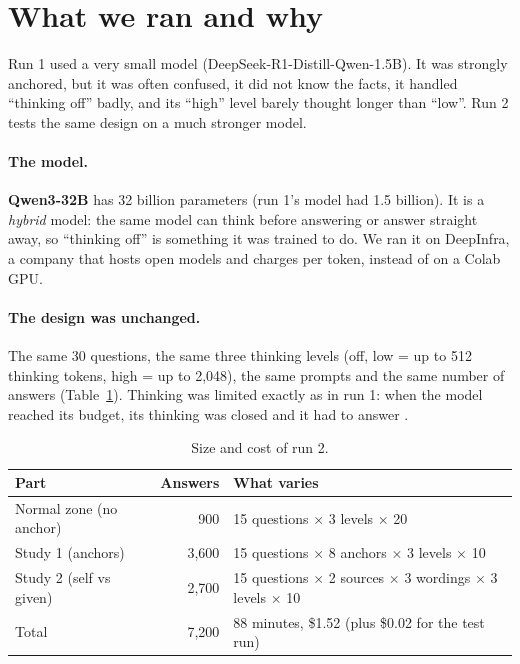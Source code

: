 \documentclass[11pt,a4paper]{article}
\begin{document}
\section{What we ran and why}

Run 1 used a very small model (DeepSeek-R1-Distill-Qwen-1.5B). It was strongly anchored, but it was often confused, it did not know the facts, it handled \enquote{thinking off} badly, and its \enquote{high} level barely thought longer than \enquote{low}. Run 2 tests the same design on a much stronger model.

\paragraph{The model.} \textbf{Qwen3-32B} \citep{yang2025qwen3} has 32 billion parameters (run 1's model had 1.5 billion). It is a \emph{hybrid} model: the same model can think before answering or answer straight away, so \enquote{thinking off} is something it was trained to do. We ran it on DeepInfra, a company that hosts open models and charges per token, instead of on a Colab GPU.

\paragraph{The design was unchanged.} The same 30 questions, the same three thinking levels (off, low = up to 512 thinking tokens, high = up to 2,048), the same prompts and the same number of answers (Table~\ref{tab:size}). Thinking was limited exactly as in run 1: when the model reached its budget, its thinking was closed and it had to answer \citep{muennighoff2025s1}.

\begin{table}[ht]
\centering\small
\begin{tabular}{lrp{7.6cm}}
\toprule
Part & Answers & What varies \\
\midrule
Normal zone (no anchor) & 900 & 15 questions $\times$ 3 levels $\times$ 20 \\
Study 1 (anchors) & 3,600 & 15 questions $\times$ 8 anchors $\times$ 3 levels $\times$ 10 \\
Study 2 (self vs given) & 2,700 & 15 questions $\times$ 2 sources $\times$ 3 wordings $\times$ 3 levels $\times$ 10 \\
\midrule
Total & 7,200 & 88 minutes, \$1.52 (plus \$0.02 for the test run) \\
\bottomrule
\end{tabular}
\caption{Size and cost of run 2.}
\label{tab:size}
\end{table}
\end{document}
